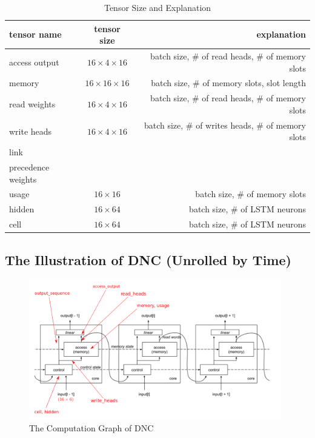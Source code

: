 \documentclass{article}
\begin{document}
\begin{table}[!htb]
\centering
\caption{Tensor Size and Explanation}
\begin{tabular}{| l | c | r |} \hline
tensor name & tensor size & explanation \\ \hline
access output & $16\times4\times16$ & batch size, $\#$ of read heads, $\#$ of memory slots \\ \hline
memory & $16\times16\times16$ & batch size, $\#$ of memory slots, slot length \\ \hline
read weights & $16\times4\times16$ & batch size, $\#$ of read heads, $\#$ of memory slots \\ \hline
write heads & $16\times4\times16$ & batch size, $\#$ of writes heads, $\#$ of memory slots \\ \hline
link  &   &   \\ \hline
precedence weights  &   &   \\ \hline
usage  & $16\times16$  & batch size, $\#$ of memory slots \\ \hline
hidden  & $16\times64$  & batch size, $\#$ of LSTM neurons \\ \hline
cell  & $16\times64$  & batch size, $\#$ of LSTM neurons \\ \hline
\end{tabular}
\end{table}

\subsection{The Illustration of DNC (Unrolled by Time)}
\begin{figure}[!htb]
\centering
\includegraphics[width=0.98\textwidth]{dnc_model.pdf}
\caption{The Computation Graph of DNC}
\label{fig:DNC_ComputationGraph}
\end{figure}
\end{document}
